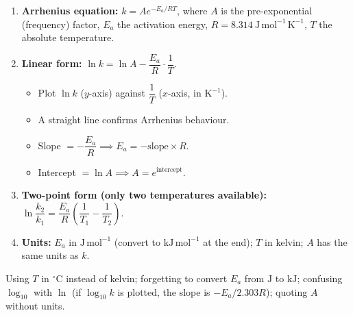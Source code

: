 \documentclass[11pt]{article}
\begin{document}
\begin{methode}
\begin{enumerate}
\item \textbf{Arrhenius equation:} $k = A e^{-E_a/RT}$, where $A$ is the pre-exponential (frequency) factor, $E_a$ the activation energy, $R = 8.314\ \mathrm{J\,mol^{-1}\,K^{-1}}$, $T$ the absolute temperature.
\item \textbf{Linear form:} $\ln k = \ln A - \dfrac{E_a}{R}\cdot\dfrac{1}{T}$.
    \begin{itemize}
    \item Plot $\ln k$ ($y$-axis) against $\dfrac{1}{T}$ ($x$-axis, in $\mathrm{K^{-1}}$).
    \item A straight line confirms Arrhenius behaviour.
    \item Slope $= -\dfrac{E_a}{R} \implies E_a = -\text{slope} \times R$.
    \item Intercept $= \ln A \implies A = e^{\text{intercept}}$.
    \end{itemize}
\item \textbf{Two-point form (only two temperatures available):} $\ln \dfrac{k_2}{k_1} = \dfrac{E_a}{R}\left(\dfrac{1}{T_1} - \dfrac{1}{T_2}\right)$.
\item \textbf{Units:} $E_a$ in $\mathrm{J\,mol^{-1}}$ (convert to $\mathrm{kJ\,mol^{-1}}$ at the end); $T$ in kelvin; $A$ has the same units as $k$.
\end{enumerate}
\end{methode}

\begin{attention}
Using $T$ in $^\circ\mathrm{C}$ instead of kelvin; forgetting to convert $E_a$ from $\mathrm{J}$ to $\mathrm{kJ}$; confusing $\log_{10}$ with $\ln$ (if $\log_{10} k$ is plotted, the slope is $-E_a/2.303R$); quoting $A$ without units.
\end{attention}
\end{document}

